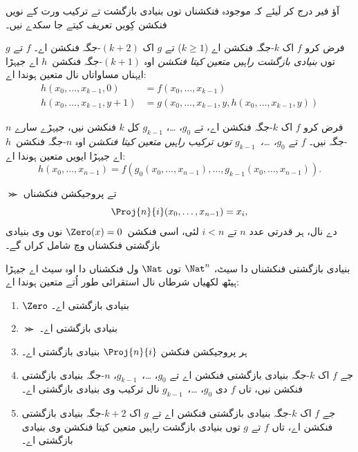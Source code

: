 \documentclass[../../../include/open-logic-section]{subfiles}
\begin{document}

آؤ فیر درج کر لَیئے کہ موجودہ فنکشناں توں
بنیادی بازگشت تے ترکیب ورت کے نویں فنکشن
کِویں تعریف کیتے جا سکدے نیں۔

\begin{defn}
   فرض کرو $f$ اک $k$-جگہ
  فنکشن اے ($k\ge 1$) تے $g$ اک $(k+2)$-جگہ فنکشن اے۔
  $f$ تے $g$ توں \emph{بنیادی بازگشت راہیں متعین کیتا فنکشن}
  اوہ $(k+1)$-جگہ فنکشن~$h$ اے جیہڑا ایہناں مساواتاں نال
  متعین ہوندا اے:
  \begin{align*}
    h(x_0,\dots,x_{k-1},0) & =  f(x_0,\dots,x_{k-1}) \\
    h(x_0,\dots,x_{k-1},y+1) & = g(x_0,\dots,x_{k-1}, y, h(x_0,\dots,x_{k-1}, y))
  \end{align*}
\end{defn}

\begin{defn}
   فرض کرو $f$ اک $k$-جگہ فنکشن اے،
  تے $g_0$، \dots، $g_{k-1}$ کل $k$ فنکشن نیں، جیہڑے
  سارے $n$-جگہ نیں۔ $f$ تے
  \emph{$g_0$، \dots،~$g_{k-1}$ توں ترکیب راہیں متعین کیتا فنکشن}
  اوہ $n$-جگہ فنکشن~$h$ اے جیہڑا ایویں متعین ہوندا اے:
  \[
  h(x_0, \dots, x_{n-1}) =
  f(g_0(x_0, \dots, x_{n-1}), \dots, g_{k-1}(x_0, \dots, x_{n-1})).
  \]
\end{defn}

$\Succ$ تے پروجیکشن فنکشناں
\[
\Proj{n}{i}(x_0,\dots,x_{n-1}) = x_i,
\]
دے نال، ہر قدرتی عدد $n$ تے $i < n$ لئی،
اسی فنکشن~$\Zero(x) = 0$ نوں وی بنیادی
بازگشتی فنکشناں وچ شامل کراں گے۔

\begin{defn}
  بنیادی بازگشتی فنکشناں دا سیٹ، $\Nat^n$ توں
  $\Nat$ ول فنکشناں دا اوہ سیٹ اے جیہڑا
  ہیٹھ لکھیاں شرطاں نال استقرائی طور اُتے
  متعین ہوندا اے:
  \begin{enumerate}
  \item $\Zero$ بنیادی بازگشتی اے۔
  \item $\Succ$ بنیادی بازگشتی اے۔
  \item ہر پروجیکشن فنکشن $\Proj{n}{i}$ بنیادی بازگشتی اے۔
  \item جے $f$ اک $k$-جگہ بنیادی بازگشتی فنکشن اے
    تے $g_0$، \dots،~$g_{k-1}$، $n$-جگہ
    بنیادی بازگشتی فنکشن نیں، تاں $f$ دی
    $g_0$، \dots،~$g_{k-1}$ نال ترکیب وی
    بنیادی بازگشتی اے۔
  \item جے $f$ اک $k$-جگہ بنیادی بازگشتی فنکشن اے
    تے $g$ اک $k+2$-جگہ بنیادی بازگشتی فنکشن اے،
    تاں $f$ تے $g$ توں بنیادی بازگشت راہیں
    متعین کیتا فنکشن وی بنیادی بازگشتی اے۔
\end{enumerate}
\end{defn}
\end{document}
